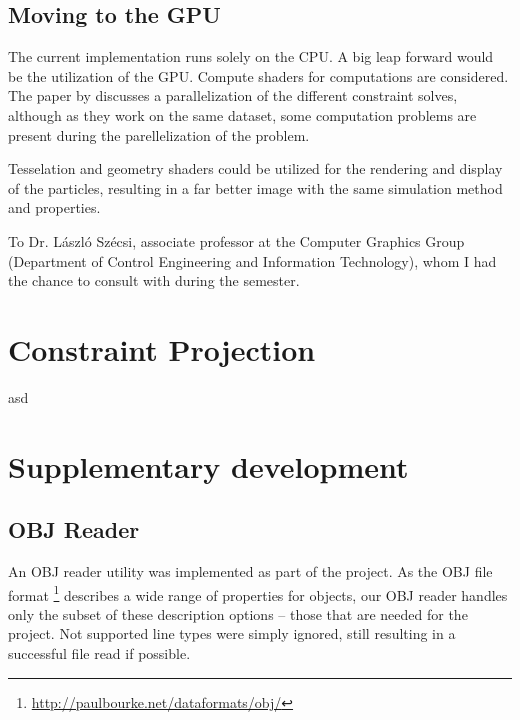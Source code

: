 \documentclass[sigplan,screen,nonacm]{acmart}
\begin{document}
\subsection{Moving to the GPU}
The current implementation runs solely on the CPU. A big leap forward would be
the utilization of the GPU. Compute shaders for computations are considered. The
paper by \citet{UmenhofferSimulation} discusses a parallelization of the
different constraint solves, although as they work on the same dataset, some
computation problems are present during the parellelization of the
problem.

Tesselation and geometry shaders could be utilized for the rendering and display
of the particles, resulting in a far better image with the same simulation
method and properties.

\begin{acks}
    To Dr. László Szécsi, associate professor at the Computer Graphics Group
    (Department of Control Engineering and Information Technology), whom I had
    the chance to consult with during the semester.
\end{acks}




\appendix

\section{Constraint Projection} \label{appendix:ConstraintProjection}
asd


\section{Supplementary development}

\subsection{OBJ Reader}
\label{section:appendixOBJ}

An OBJ reader utility was implemented as part of the project. As the OBJ file
format \footnote{\url{http://paulbourke.net/dataformats/obj/}} describes a wide range
of properties for objects, our OBJ reader handles only the subset of
these description options -- those that are needed for the project. Not
supported line types were simply ignored, still resulting in
a successful file read if possible.
\end{document}
